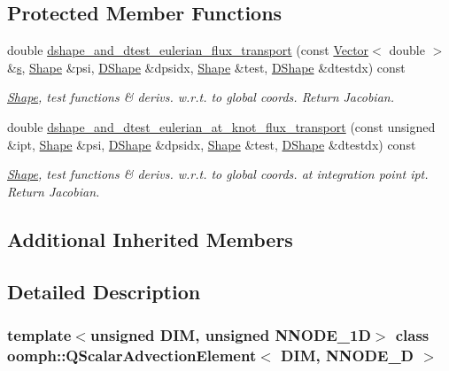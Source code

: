 \subsection*{Protected Member Functions}
\begin{DoxyCompactItemize}
\item 
double \hyperlink{classoomph_1_1QScalarAdvectionElement_a9fb6d850442888b831a409fb41b7d1be}{dshape\+\_\+and\+\_\+dtest\+\_\+eulerian\+\_\+flux\+\_\+transport} (const \hyperlink{classoomph_1_1Vector}{Vector}$<$ double $>$ \&\hyperlink{cfortran_8h_ab7123126e4885ef647dd9c6e3807a21c}{s}, \hyperlink{classoomph_1_1Shape}{Shape} \&psi, \hyperlink{classoomph_1_1DShape}{D\+Shape} \&dpsidx, \hyperlink{classoomph_1_1Shape}{Shape} \&test, \hyperlink{classoomph_1_1DShape}{D\+Shape} \&dtestdx) const
\begin{DoxyCompactList}\small\item\em \hyperlink{classoomph_1_1Shape}{Shape}, test functions \& derivs. w.\+r.\+t. to global coords. Return Jacobian. \end{DoxyCompactList}\item 
double \hyperlink{classoomph_1_1QScalarAdvectionElement_aa7d957edda208be9ab56322dc735fda7}{dshape\+\_\+and\+\_\+dtest\+\_\+eulerian\+\_\+at\+\_\+knot\+\_\+flux\+\_\+transport} (const unsigned \&ipt, \hyperlink{classoomph_1_1Shape}{Shape} \&psi, \hyperlink{classoomph_1_1DShape}{D\+Shape} \&dpsidx, \hyperlink{classoomph_1_1Shape}{Shape} \&test, \hyperlink{classoomph_1_1DShape}{D\+Shape} \&dtestdx) const
\begin{DoxyCompactList}\small\item\em \hyperlink{classoomph_1_1Shape}{Shape}, test functions \& derivs. w.\+r.\+t. to global coords. at integration point ipt. Return Jacobian. \end{DoxyCompactList}\end{DoxyCompactItemize}
\subsection*{Additional Inherited Members}


\subsection{Detailed Description}
\subsubsection*{template$<$unsigned D\+IM, unsigned N\+N\+O\+D\+E\+\_\+1D$>$\newline
class oomph\+::\+Q\+Scalar\+Advection\+Element$<$ D\+I\+M, N\+N\+O\+D\+E\+\_\+D $>$}

